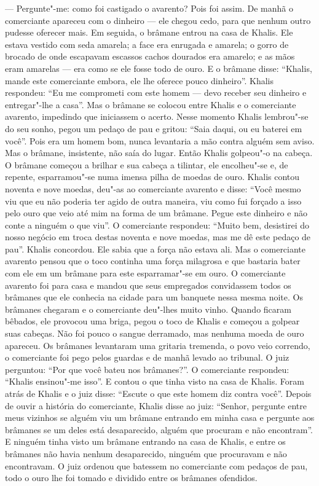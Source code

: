 --- Pergunte"-me: como foi castigado o avarento? Pois foi assim. De manhã
o comerciante apareceu com o dinheiro --- ele chegou cedo, para que
nenhum outro pudesse oferecer mais. Em seguida, o brâmane entrou na casa
de Khalis. Ele estava vestido com seda amarela; a face era enrugada e
amarela; o gorro de brocado de onde escapavam escassos cachos dourados
era amarelo; e as mãos eram amarelas --- era como se ele fosse todo de
ouro. E o brâmane disse: ``Khalis, mande este comerciante embora, ele
lhe oferece pouco dinheiro''. Khalis respondeu: ``Eu me comprometi com
este homem --- devo receber seu dinheiro e entregar"-lhe a casa''. Mas o
brâmane se colocou entre Khalis e o comerciante avarento, impedindo que
iniciassem o acerto. Nesse momento Khalis lembrou"-se do seu sonho, pegou
um pedaço de pau e gritou: ``Saia daqui, ou eu baterei em você''. Pois
era um homem bom, nunca levantaria a mão contra alguém sem aviso. Mas o
brâmane, insistente, não saía do lugar. Então Khalis golpeou"-o na
cabeça. O brâmane começou a brilhar e sua cabeça a tilintar, ele
encolheu"-se e, de repente, esparramou"-se numa imensa pilha de moedas de
ouro. Khalis contou noventa e nove moedas, deu"-as ao comerciante
avarento e disse: ``Você mesmo viu que eu não poderia ter agido de outra
maneira, viu como fui forçado a isso pelo ouro que veio até mim na forma
de um brâmane. Pegue este dinheiro e não conte a ninguém o que viu''. O
comerciante respondeu: ``Muito bem, desistirei do nosso negócio em troca
destas noventa e nove moedas, mas me dê este pedaço de pau''. Khalis
concordou. Ele sabia que a força não estava ali. Mas o comerciante
avarento pensou que o toco continha uma força milagrosa e que bastaria
bater com ele em um brâmane para este esparramar"-se em ouro. O
comerciante avarento foi para casa e mandou que seus empregados
convidassem todos os brâmanes que ele conhecia na cidade para um
banquete nessa mesma noite. Os brâmanes chegaram e o comerciante
deu"-lhes muito vinho. Quando ficaram bêbados, ele provocou uma briga,
pegou o toco de Khalis e começou a golpear suas cabeças. Não foi pouco o
sangue derramado, mas nenhuma moeda de ouro apareceu. Os brâmanes
levantaram uma gritaria tremenda, o povo veio correndo, o comerciante
foi pego pelos guardas e de manhã levado ao tribunal. O juiz perguntou:
``Por que você bateu nos brâmanes?''. O comerciante respondeu: ``Khalis
ensinou"-me isso''. E contou o que tinha visto na casa de Khalis. Foram
atrás de Khalis e o juiz disse: ``Escute o que este homem diz contra
você''. Depois de ouvir a história do comerciante, Khalis disse ao juiz:
``Senhor, pergunte entre meus vizinhos se alguém viu um brâmane entrando
em minha casa e pergunte aos brâmanes se um deles está desaparecido,
alguém que procuram e não encontram''. E ninguém tinha visto um brâmane
entrando na casa de Khalis, e entre os brâmanes não havia nenhum
desaparecido, ninguém que procuravam e não encontravam. O juiz ordenou
que batessem no comerciante com pedaços de pau, todo o ouro lhe foi
tomado e dividido entre os brâmanes ofendidos.

